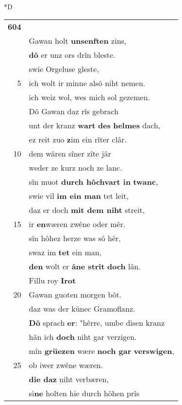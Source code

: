 \documentclass[8pt,a4paper,notitlepage]{article}
\begin{document}
\begin{table}[ht]
\begin{minipage}[t]{0.5\linewidth}
\small
\begin{center}*D
\end{center}
\begin{tabular}{rl}
\textbf{604} & \textit{\begin{large}D\end{large}}az wazzer hiez Sabbins.\\ 
 & Gawan holt \textbf{unsenften} zins,\\ 
 & \textbf{dô} er unz ors drîn bleste.\\ 
 & swie Orgeluse gleste,\\ 
5 & ich wolt ir minne alsô niht nemen.\\ 
 & ich weiz wol, wes mich sol gezemen.\\ 
 & Dô Gawan daz rîs gebrach\\ 
 & unt der kranz \textbf{wart} \textbf{des} \textbf{helmes} dach,\\ 
 & ez reit zuo \textbf{z}im ein rîter clâr.\\ 
10 & dem wâren sîner zîte jâr\\ 
 & weder ze kurz noch ze lanc.\\ 
 & sîn muot \textbf{durch hôchvart in} \textbf{twanc},\\ 
 & swie vil \textbf{im ein man} tet leit,\\ 
 & daz er doch \textbf{mit dem niht} streit,\\ 
15 & ir \textbf{en}wæren zwêne oder mêr.\\ 
 & sîn hôhez herze was sô hêr,\\ 
 & swaz im \textbf{tet} ein man,\\ 
 & \textbf{den} wolt er \textbf{âne strît} \textbf{doch} lân.\\ 
 & Fillu roy \textbf{Irot}\\ 
20 & Gawan guoten morgen bôt.\\ 
 & daz was der künec Gramoflanz.\\ 
 & \textbf{Dô} sprach \textbf{er}: "hêrre, umbe disen kranz\\ 
 & hân ich \textbf{doch} niht gar verzigen.\\ 
 & mîn \textbf{grüezen} wære \textbf{noch gar} \textbf{verswigen},\\ 
25 & ob iwer zwêne wæren.\\ 
 & \textbf{die daz} niht verbæren,\\ 
 & si\textbf{ne} holten hie durch hôhen prîs\\ 

\end{tabular}
\end{minipage}
\end{table}
\end{document}
